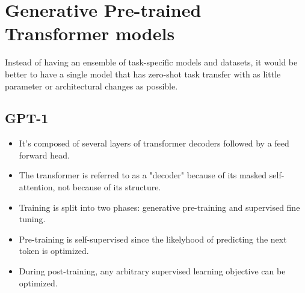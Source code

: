 \documentclass{article}
\begin{document}
\section{Generative Pre-trained Transformer models}

Instead of having an ensemble of task-specific models and datasets, it would be better to have a
single model that has zero-shot task transfer with as little parameter or architectural changes as possible.

\subsection{GPT-1}
\begin{itemize}
\item It's composed of several layers of transformer decoders followed by a feed forward head.
\item The transformer is referred to as a "decoder" because of its masked self-attention, not because of its structure.
\item Training is split into two phases: generative pre-training and supervised fine tuning.
\item Pre-training is self-supervised since the likelyhood of predicting the next token is optimized.
\item During post-training, any arbitrary supervised learning objective can be optimized.
\end{itemize}
\end{document}
